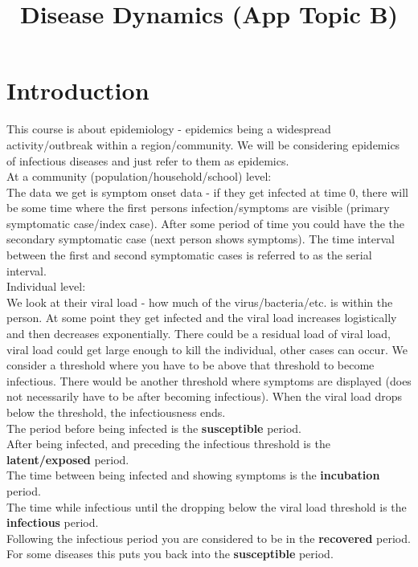 \documentclass{X:/Documents/Coding/Latex/myassignment}
\title{Disease Dynamics (App Topic B)}
\begin{document}
\setlength{\parindent}{0pt}
\maketitle

\section{Introduction}
This course is about epidemiology - epidemics being a widespread activity/outbreak within a region/community. We will be considering epidemics of infectious diseases and just refer to them as epidemics.\\

At a community (population/household/school) level:\\
The data we get is symptom onset data - if they get infected at time $0$, there will be some time where the first persons infection/symptoms are visible (primary symptomatic case/index case). After some period of time you could have the the secondary symptomatic case (next person shows symptoms).
The time interval between the first and second symptomatic cases is referred to as the serial interval. \\

Individual level:\\
We look at their viral load - how much of the virus/bacteria/etc. is within the person.
At some point they get infected and the viral load increases logistically and then decreases exponentially. There could be a residual load of viral load, viral load could get large enough to kill the individual, other cases can occur. We consider a threshold where you have to be above that threshold to become infectious. There would be another threshold where symptoms are displayed (does not necessarily have to be after becoming infectious).
When the viral load drops below the threshold, the infectiousness ends.\\

The period before being infected is the \textbf{susceptible} period.\\
After being infected, and preceding the infectious threshold is the \textbf{latent/exposed} period.\\
The time between being infected and showing symptoms is the \textbf{incubation} period.\\
The time while infectious until the dropping below the viral load threshold is the \textbf{infectious} period.\\ 
Following the infectious period you are considered to be in the \textbf{recovered} period. For some diseases this puts you back into the \textbf{susceptible} period.\\
\end{document}
